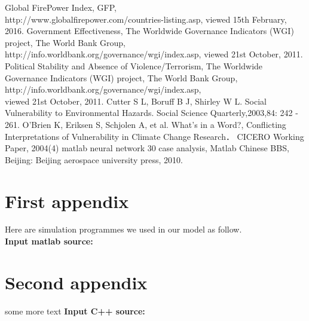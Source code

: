 \documentclass{mcmthesis}
\begin{document}
\begin{thebibliography}{99}
 Global FirePower Index, GFP, \\http://www.globalfirepower.com/countries-listing.asp, viewed 15th February, 2016.
 Government Effectiveness, The Worldwide Governance Indicators (WGI) project, The World Bank Group, http://info.worldbank.org/governance/wgi/index.asp, viewed 21st October, 2011.
 Political Stability and Absence of Violence/Terrorism, The Worldwide Governance Indicators (WGI) project, The World Bank Group, \\http://info.worldbank.org/governance/wgi/index.asp,\\ viewed 21st October, 2011.
 Cutter S L, Boruff B J, Shirley W L. Social Vulnerability to Environmental Hazards. Social Science Quarterly,2003,84: 242 - 261.
 O’Brien K, Eriksen S, Schjolen A, et al. What’s in a Word?, Conflicting Interpretations of Vulnerability in Climate Change Research． CICERO Working Paper, 2004(4)
 matlab neural network 30 case analysis, Matlab Chinese BBS, Beijing: Beijing aerospace university press, 2010.
\end{thebibliography}

\begin{appendices}

\section{First appendix}

\lipsum[13]

Here are simulation programmes we used in our model as follow.\\

\textbf{\textcolor[rgb]{0.98,0.00,0.00}{Input matlab source:}}


\section{Second appendix}

some more text \textcolor[rgb]{0.98,0.00,0.00}{\textbf{Input C++ source:}}


\end{appendices}
\end{document}
